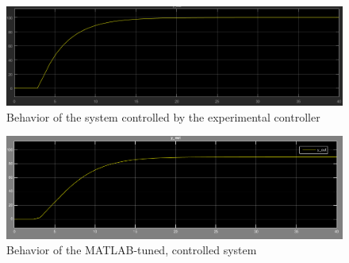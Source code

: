 \begin{figure}[H]
\begin{center}
\includegraphics[width=1\linewidth]{images/general/system_control1}
\end{center}
\caption{Behavior of the system controlled by the experimental controller}
\label{fig:system_control1}
\end{figure}

\begin{figure}[H]
\begin{center}
\includegraphics[width=1\linewidth]{images/general/system_control2}
\end{center}
\caption{Behavior of the MATLAB-tuned, controlled system}
\label{fig:system_control2}
\end{figure}
\newpage
